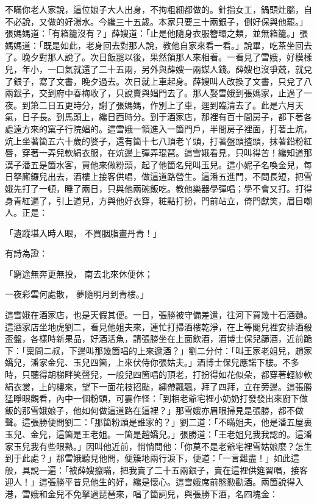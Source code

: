 \begin{showcontents}{}
不瞞你老人家說，這位娘子大人出身，不拘粗細都做的。針指女工，鍋頭灶腦，自不必說，又做的好湯水。今纔三十五歲。本家只要三十兩銀子，倒好保與他罷。」張媽媽道：「有箱籠沒有？」薛嫂道：「止是他隨身衣服簪環之類，並無箱籠。」張媽媽道：「既是如此，老身回去對那人說，教他自家來看一看。」說畢，吃茶坐回去了。晚夕對那人說了。次日飯罷以後，果然領那人來相看。一看見了雪娥，好模樣兒，年小，一口氣就還了二十五兩，另外與薛嫂一兩媒人錢。薛嫂也沒爭兢，就兌了銀子，寫了文書，晚夕過去。次日就上車起身。薛嫂叫人改換了文書，只兌了八兩銀子，交到府中春梅收了，只說賣與娼門去了。那人娶雪娥到張媽家，止過了一夜。到第二日五更時分，謝了張媽媽，作別上了車，逕到臨清去了。此是六月天氣，日子長。到馬頭上，纔日西時分。到于酒家店，那裡有百十間房子，都下著各處遠方來的窠子行院娼的。這雪娥一領進入一箇門戶，半間房子裡面，打著土炕，炕上坐著箇五六十歲的婆子，還有箇十七八頂老丫頭，打著盤頭揸頭，抹著鉛粉紅唇，穿著一弄兒軟絹衣服，在炕邊上彈弄琨琶。這雪娥看見，只叫得苦！纔知道那漢子潘五是箇水客，買他來做粉頭，起了他箇名兒叫玉兒。這小妮子名喚金兒，每日拏廝鑼兒出去，酒樓上接客供唱，做這道路營生。這潘五進門，不問長短，把雪娥先打了一頓，睡了兩日，只與他兩碗飯吃。教他樂器學彈唱；學不會又打。打得身青紅遍了，引上道兒，方與他好衣穿，粧點打扮，門前站立，倚門獻笑，眉目嘲人。正是：

「遺蹤堪入時人眼，  不買胭脂畫丹青！」

有詩為證：

「窮途無奔更無投，  南去北來休便休；

一夜彩雲何處散，  夢隨明月到青樓。」

這雪娥在酒家店，也是天假其便。一日，張勝被守備差遣，往河下買幾十石酒麯。這酒家店坐地虎劉二，看見他姐夫來，連忙打掃酒樓乾淨，在上等閣兒裡安排酒殽盃盤，各樣時新果品，好酒活魚，請張勝坐在上面飲酒，酒博士保兒篩酒，近前跪下：「稟問二叔，下邊叫那幾箇唱的上來遞酒？」劉二分付：「叫王家老姐兒，趙家嬌兒，潘家金兒、玉兒四箇，上來伏侍你張姑夫。」酒博士保兒應諾下樓。不多時，只聽得胡梯畔笑聲兒，一般兒四箇唱的頂老，打扮得如花似朵，都穿著輕紗軟絹衣裳，上的樓來，望下一面花枝招颭，繡帶飄飄，拜了四拜，立在旁邊。這張勝猛睜眼觀看，內中一個粉頭，可霎作怪：「到相老爺宅裡小奶奶打發發出來廚下做飯的那雪娥娘子，他如何做這道路在這裡？」那雪娥亦眉眼掃見是張勝，都不做聲。這張勝便問劉二：「那箇粉頭是誰家的？」劉二道：「不瞞姐夫，他是潘五屋裏玉兒、金兒，這箇是王老姐。一箇是趙嬌兒。」張勝道：「王老姐兒我我認的。這潘家玉兒我有些眼熟。」因叫他近前，悄悄問他：「你莫不是老爺宅裡雪姑娘麼？怎生到于此處？」那雪娥聽見他問，便簇地兩行淚下，便道：「一言難盡！」如此這般，具說一遍：「被薛嫂攛瞞，把我賣了二十五兩銀子，賣在這裡供筵習唱，接客迎人！」這張勝平昔見他生的好，纔是懷心。這雪娥席前慇懃勸酒。兩箇說得入港，雪娥和金兒不免拏過琵琶來，唱了箇詞兒，與張勝下酒，名四塊金：


\end{showcontents}
